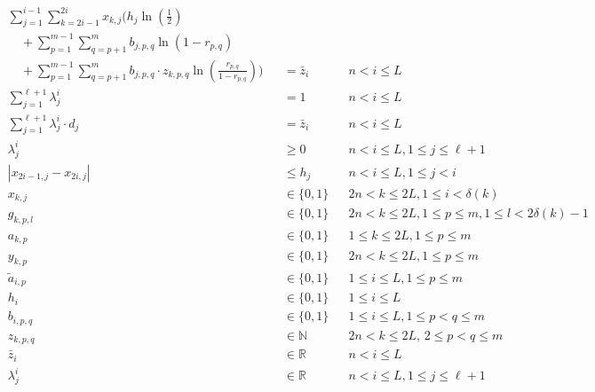 \documentclass[runningheads]{llncs}
\begin{document}
\begin{align*}
                 & \sum^{i-1}_{j=1}\sum_{k=2i-1}^{2i}x_{k,j}\bigg(h_j\ln(\frac{1}{2})\\
                 & \quad + \sum_{p=1}^{m-1}\sum_{q=p+1}^m b_{j,p,q}\ln(1-r_{p,q})\\
                 & \quad + \sum_{p=1}^{m-1}\sum_{q=p+1}^m  b_{j,p,q} \cdot z_{k,p,q} \ln(\frac{r_{p,q}}{1-r_{p,q}}) \bigg) && = \bar{z}_i && {\scriptstyle n < i \leq L}\\
                 & \sum_{j=1}^{\ell+1} \lambda^i_j                                    && = 1                  && {\scriptstyle n < i \leq L}\\
                 & \sum_{j=1}^{\ell+1} \lambda^i_j\cdot d_j                           && = \bar{z}_i          && {\scriptstyle n < i \leq L}\\
                 & \lambda^i_j                                                        && \geq 0               && {\scriptstyle n < i \leq L, 1 \leq j \leq \ell+1}\\
                 & |x_{2i-1,j} - x_{2i,j}|                                            && \leq h_j             && {\scriptstyle n < i \leq L, 1 \leq j < i}\\
                 & x_{k,j}                                                            && \in \{0,1\}          && {\scriptstyle 2n < k \leq 2L, 1 \leq i < \delta(k)}\\
                 & g_{k,p,l}                                                          && \in \{0,1\}          && {\scriptstyle 2n < k \leq 2L, 1 \leq p \leq m, 1 \leq l<2\delta(k)-1}\\
                 & a_{k,p}                                                            && \in \{0,1\}          && {\scriptstyle 1 \leq k \leq 2L, 1 \leq p \leq m}\\
                 & y_{k,p}                                                            && \in \{0,1\}          && {\scriptstyle 2n < k \leq 2L, 1 \leq p \leq m}\\
                 & \tilde{a}_{i,p}                                                    && \in \{0,1\}          && {\scriptstyle 1 \leq i \leq L, 1 \leq p \leq m}\\
                 & h_{i}                                                              && \in \{0,1\}          && {\scriptstyle 1 \leq i \leq L}\\
                 & b_{i,p,q}                                                          && \in \{0,1\}          && {\scriptstyle 1 \leq i \leq L, 1 \leq p<q \leq m}\\
                 & z_{k,p,q}                                                          && \in \mathbb{N}       && {\scriptstyle 2n < k \leq 2L,\, 2 \leq p < q \leq m}\\
                 & \bar{z}_{i}                                                        && \in \mathbb{R}       && {\scriptstyle n < i \leq L}\\
                 & \lambda^i_j                                                        && \in \mathbb{R}       && {\scriptstyle n < i \leq L, 1 \leq j \leq \ell+1}
\end{align*}
\endgroup
\end{document}
